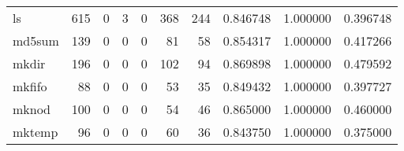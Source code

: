 \begin{tabular}{lrrrrrrrrr}
ls        &                                   615 &                                                  0 &                                                  3 &                                                  0 &                                                368 &                                                244 &                                           0.846748 &                               1.000000 &                             0.396748 \\
md5sum    &                                   139 &                                                  0 &                                                  0 &                                                  0 &                                                 81 &                                                 58 &                                           0.854317 &                               1.000000 &                             0.417266 \\
mkdir     &                                   196 &                                                  0 &                                                  0 &                                                  0 &                                                102 &                                                 94 &                                           0.869898 &                               1.000000 &                             0.479592 \\
mkfifo    &                                    88 &                                                  0 &                                                  0 &                                                  0 &                                                 53 &                                                 35 &                                           0.849432 &                               1.000000 &                             0.397727 \\
mknod     &                                   100 &                                                  0 &                                                  0 &                                                  0 &                                                 54 &                                                 46 &                                           0.865000 &                               1.000000 &                             0.460000 \\
mktemp    &                                    96 &                                                  0 &                                                  0 &                                                  0 &                                                 60 &                                                 36 &                                           0.843750 &                               1.000000 &                             0.375000 \\

\end{tabular}
